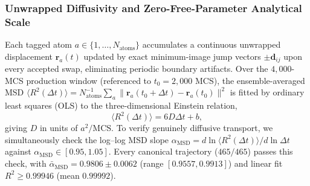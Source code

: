 \documentclass[aps,pre,reprint,superscriptaddress,amsmath,amssymb,floatfix]{revtex4-2}
\begin{document}
\subsubsection{Unwrapped Diffusivity and Zero-Free-Parameter Analytical Scale}

Each tagged atom $a \in \{1,\dots,N_{\mathrm{atoms}}\}$ accumulates a continuous unwrapped displacement $\mathbf{r}_a(t)$ updated by exact minimum-image jump vectors $\pm \mathbf{d}_{ij}$ upon every accepted swap, eliminating periodic boundary artifacts. Over the $4{,}000$-MCS production window (referenced to $t_0 = 2{,}000$ MCS), the ensemble-averaged MSD $\langle R^2(\Delta t) \rangle = N_{\mathrm{atoms}}^{-1}\sum_a \|\mathbf{r}_a(t_0 + \Delta t) - \mathbf{r}_a(t_0)\|^2$ is fitted by ordinary least squares (OLS) to the three-dimensional Einstein relation,
\begin{equation}
  \langle R^2(\Delta t) \rangle = 6 D \Delta t + b,
  \label{eq:einstein}
\end{equation}
giving $D$ in units of $a^2/\mathrm{MCS}$. To verify genuinely diffusive transport, we simultaneously check the log--log MSD slope $\alpha_{\mathrm{MSD}} = d\ln\langle R^2(\Delta t)\rangle / d\ln \Delta t$ against $\alpha_{\mathrm{MSD}} \in [0.95, 1.05]$. Every canonical trajectory ($465/465$) passes this check, with $\bar{\alpha}_{\mathrm{MSD}} = 0.9806 \pm 0.0062$ (range $[0.9557, 0.9913]$) and linear fit $R^2 \ge 0.99946$ (mean $0.99992$).
\end{document}
